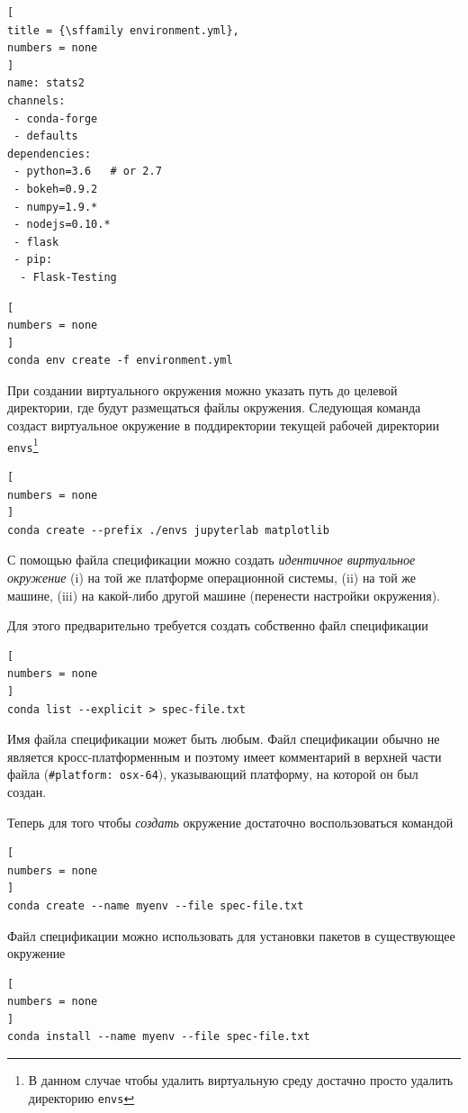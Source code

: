 \documentclass[%
	11pt,
	a4paper,
	utf8,
		]{article}
\begin{document}
\begin{lstlisting}[
title = {\sffamily environment.yml},
numbers = none
]
name: stats2
channels:
 - conda-forge
 - defaults
dependencies:
 - python=3.6   # or 2.7
 - bokeh=0.9.2
 - numpy=1.9.*
 - nodejs=0.10.*
 - flask
 - pip:
  - Flask-Testing
\end{lstlisting}

\begin{lstlisting}[
numbers = none
]
conda env create -f environment.yml
\end{lstlisting}

При создании виртуального окружения можно указать путь до целевой директории, где будут размещаться файлы окружения. Следующая команда создаст виртуальное окружение в поддиректории текущей рабочей директории \texttt{envs}\footnote{В данном случае чтобы удалить виртуальную среду достачно просто удалить директорию \texttt{envs}}

\begin{lstlisting}[
numbers = none
]
conda create --prefix ./envs jupyterlab matplotlib
\end{lstlisting}

С помощью файла спецификации можно создать \emph{идентичное виртуальное окружение} (i) на той же платформе операционной системы, (ii) на той же машине, (iii) на какой-либо другой машине (перенести настройки окружения).

Для этого предварительно требуется создать собственно файл спецификации

\begin{lstlisting}[
numbers = none
]
conda list --explicit > spec-file.txt
\end{lstlisting}

Имя файла спецификации может быть любым. Файл спецификации обычно не является кросс-платформенным и поэтому имеет комментарий в верхней части файла (\lstinline{#platform: osx-64}), указывающий платформу, на которой он был создан.

Теперь для того чтобы \emph{создать} окружение достаточно воспользоваться командой

\begin{lstlisting}[
numbers = none
]
conda create --name myenv --file spec-file.txt
\end{lstlisting}

Файл спецификации можно использовать для установки пакетов в существующее окружение

\begin{lstlisting}[
numbers = none
]
conda install --name myenv --file spec-file.txt
\end{lstlisting}
\end{document}
